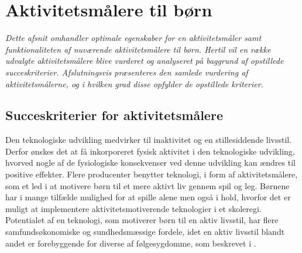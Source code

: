 \section{Aktivitetsmålere til børn} \label{tracker_intro}
\textit{Dette afsnit omhandler optimale egenskaber for en aktivitetsmåler samt funktionaliteten af nuværende aktivitetsmålere til børn. Hertil vil en række udvalgte aktivitetsmålere blive vurderet og analyseret på baggrund af opstillede succeskriterier. Afslutningsvis præsenteres den samlede vurdering af aktivitetsmålerne, og i hvilken grad disse opfylder de opstillede kriterier.}
%
\subsection{Succeskriterier for aktivitetsmålere} \label{succeskrav}
Den teknologiske udvikling medvirker til inaktivitet og en stillesiddende livsstil. Derfor ønskes det at få inkorporeret fysisk aktivitet i den teknologiske udvikling, hvorved nogle af de fysiologiske konsekvenser ved denne udvikling kan ændres til positive effekter. \citep{ObesityActionCoalition} Flere producenter benytter teknologi, i form af aktivitetsmålere, som et led i at motivere børn til et mere aktivt liv gennem spil og leg. Børnene har i mange tilfælde mulighed for at spille alene men også i hold, hvorfor det er muligt at implementere aktivitetsmotiverende teknologier i et skoleregi. \citep{Fuhu2015,PowerAbout2015}
Potentialet af en teknologi, som motiverer børn til en aktiv livsstil, har flere samfundsøkonomiske og sundhedsmæssige fordele, idet en aktiv livsstil blandt andet er forebyggende for diverse af følgesygdomme, som beskrevet i .

